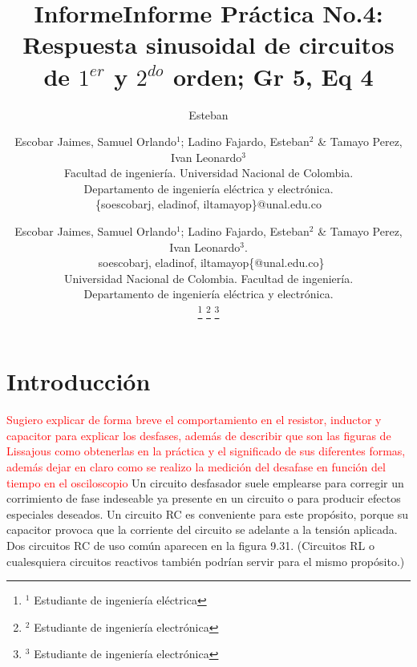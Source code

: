 \documentclass[twocolumn,11pts]{IEEEtran}
\author{Esteban}
\title{Informe}
\begin{document}
\renewcommand{\tablename}{TABLA}

\title{Informe Práctica No.4: Respuesta sinusoidal de circuitos de $1^{er}$ y $2^{do}$ orden; Gr 5, Eq 4}

\author{Escobar Jaimes, Samuel Orlando$^1$; Ladino Fajardo, Esteban$^2$ \& Tamayo Perez, Ivan Leonardo$^3$    \\
Facultad de ingeniería. Universidad Nacional de Colombia. \\
Departamento de ingeniería eléctrica y electrónica.\\
\{soescobarj, eladinof, iltamayop\}@unal.edu.co}
\author{ Escobar Jaimes, Samuel Orlando$^1$; Ladino Fajardo, Esteban$^2$ \& Tamayo Perez, Ivan Leonardo$^3$.
\\\
soescobarj, eladinof, iltamayop\{@unal.edu.co\}\\
Universidad Nacional de Colombia. Facultad de ingeniería.\\
Departamento de ingeniería eléctrica y electrónica. \\
\thanks{$^{1}$
        {\small Estudiante de ingeniería eléctrica}} 
\thanks{$^{2}$
        {\small Estudiante de ingeniería electrónica}}
\thanks{$^{3}$
        {\small Estudiante de ingeniería electrónica}}
}

\maketitle
\begin{abstract}
   
\end{abstract}
\begin{IEEEkeywords} 
\end{IEEEkeywords}



\section{Introducción}
\textcolor{red}{Sugiero explicar de forma breve el comportamiento en el resistor, inductor y capacitor para explicar los desfases, además de describir que son las figuras de Lissajous como obtenerlas en la práctica y el significado de sus diferentes formas, además dejar en claro como se realizo la medición del desafase en función del tiempo en el osciloscopio}
Un circuito desfasador suele emplearse para corregir un corrimiento de fase
indeseable ya presente en un circuito o para producir efectos especiales deseados.
Un circuito RC es conveniente para este propósito, porque su capacitor
provoca que la corriente del circuito se adelante a la tensión aplicada. Dos
circuitos RC de uso común aparecen en la figura 9.31. (Circuitos RL o cualesquiera
circuitos reactivos también podrían servir para el mismo propósito.)\cite{1}
\end{document}

